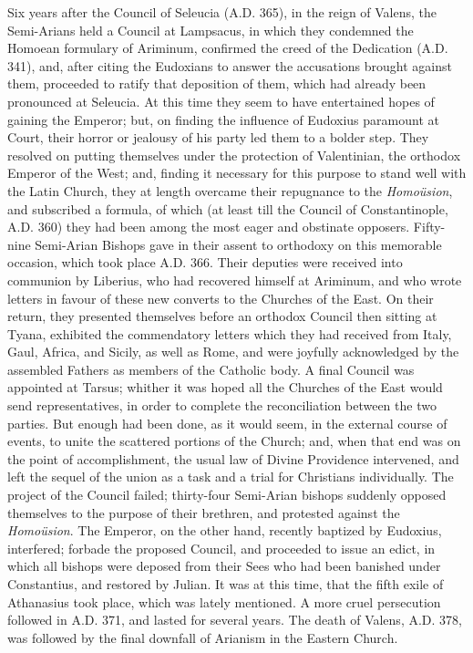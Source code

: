 Six years after the Council of Seleucia (A.D.
365), in the reign of Valens, the Semi-Arians held a Council at
Lampsacus, in which they condemned the Homoean formulary of Ariminum,
confirmed the creed of the Dedication (A.D.
341), and, after citing the Eudoxians to answer the accusations
brought against them, proceeded to ratify that deposition of them,
which had already been pronounced at Seleucia. At this time they
seem to have entertained hopes of gaining the Emperor; but, on finding
the influence of Eudoxius paramount at Court, their horror or jealousy
of his party led them to a bolder step. They resolved on putting
themselves under the protection of Valentinian, the orthodox Emperor
of the West; and, finding it necessary for this purpose to stand well
with the Latin Church, they at length overcame their repugnance to the
\emph{Homoüsion}, and subscribed a formula, of which (at least till
the Council of Constantinople, A.D. 360) they
had been among the most eager and obstinate opposers. Fifty-nine
Semi-Arian Bishops gave in their assent to orthodoxy on this memorable
occasion, which took place A.D. 366. Their
deputies were received into communion by Liberius, who had recovered
himself at Ariminum, and who wrote letters in favour of these new
converts to the Churches of the East. On their return, they presented
themselves before an orthodox Council then sitting at Tyana, exhibited
the commendatory letters which they had received from Italy, Gaul,
Africa, and Sicily, as well as Rome, and were joyfully acknowledged by
the assembled Fathers as members of the Catholic body. A final Council
was appointed at Tarsus; whither it was hoped all the Churches of the
East would send representatives, in order to complete the
reconciliation between the two parties. But enough had been done, as
it would seem, in the external course of events, to unite the
scattered portions of the Church; and, when that end was on the point
of accomplishment, the usual law of Divine Providence intervened, and
left the sequel of the union as a task and a trial for
Christians individually. The project of the Council failed;
thirty-four Semi-Arian bishops suddenly opposed themselves to the
purpose of their brethren, and protested against the \emph{Homoüsion}.
The Emperor, on the other hand, recently baptized by Eudoxius,
interfered; forbade the proposed Council, and proceeded to issue an
edict, in which all bishops were deposed from their Sees who had been
banished under Constantius, and restored by Julian. It was at this
time, that the fifth exile of Athanasius took place, which was lately
mentioned. A more cruel persecution followed in A.D.
371, and lasted for several years. The death of Valens, A.D.
378, was followed by the final downfall of Arianism in the Eastern
Church.

